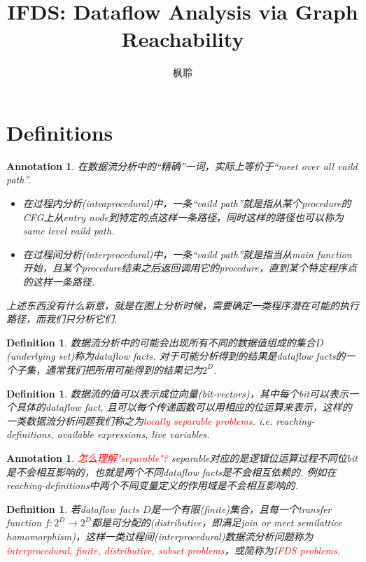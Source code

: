 \documentclass{article}
\newtheorem{definition}[theorem]{Definition}
\newtheorem{annotation}[theorem]{Annotation}
\newcommand*{\xfunc}[4]{{#2}\colon{#3}{#1}{#4}}
\newcommand*{\func}[3]{\xfunc{\to}{#1}{#2}{#3}}
\newcommand{\redt}[1]{\textcolor{red}{#1}}
\begin{document}
\title{IFDS: Dataflow Analysis via Graph Reachability}
\author{枫聆}
\maketitle
\tableofcontents

\newpage
\section{Definitions}


\begin{annotation}
\rm 在数据流分析中的“精确”一词，实际上等价于“meet over all vaild path”. 
\begin{itemize}
	\item 在过程内分析(intraprocedural)中，一条“vaild path”就是指从某个procedure的CFG上从entry node到特定的点这样一条路径，同时这样的路径也可以称为same level vaild path.  
	\item 在过程间分析(interprocedural)中，一条“vaild path”就是指当从main function开始，且某个procedure结束之后返回调用它的procedure，直到某个特定程序点的这样一条路径.  
\end{itemize}
上述东西没有什么新意，就是在图上分析时候，需要确定一类程序潜在可能的执行路径，而我们只分析它们.  
\end{annotation}

\begin{definition}
\rm 数据流分析中的可能会出现所有不同的数据值组成的集合$D$(underlying set)称为dataflow facts. 对于可能分析得到的结果是dataflow facts的一个子集，通常我们把所用可能得到的结果记为$2^D$. 
\end{definition}

\begin{definition}
\rm 数据流的值可以表示成位向量(bit-vectors)，其中每个bit可以表示一个具体的dataflow fact, 且可以每个传递函数可以用相应的位运算来表示，这样的一类数据流分析问题我们称之为\redt{locally separable problems}. i.e. reaching-definitions, available expressions, live variables. 
\end{definition}

\begin{annotation}
\rm \redt{怎么理解"separable"?} separable对应的是逻辑位运算过程不同位bit是不会相互影响的，也就是两个不同dataflow facts是不会相互依赖的. 例如在reaching-definitions中两个不同变量定义的作用域是不会相互影响的.   
\end{annotation}


\begin{definition}
\rm 若dataflow facts $D$是一个有限(finite)集合，且每一个transfer function $\func{f}{2^D}{2^D}$都是可分配的(distributive，即满足join or meet semilattice homomorphism)，这样一类过程间(interprocedural)数据流分析问题称为\redt{interprocedural, finite, distributive, subset problems}，或简称为\redt{IFDS problems}.
\end{definition}
\end{document}
